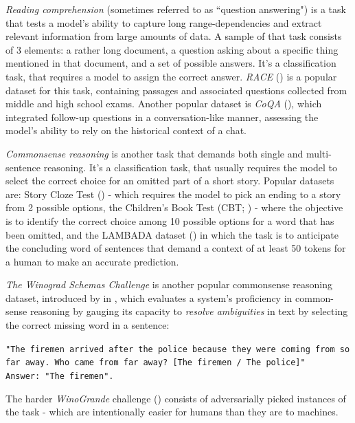 \documentclass{article}
\begin{document}
\medskip
\noindent
\emph{Reading comprehension} (sometimes referred to as ``question answering") is a task that tests a model's ability to capture long range-dependencies and extract relevant information from large amounts of data. A sample of that task consists of 3 elements: a rather long document, a question asking about a specific thing mentioned in that document, and a set of possible answers. It's a classification task, that requires a model to assign the correct answer. \emph{RACE} (\citet{lai2017race}) is a popular dataset for this task, containing passages and associated questions collected from middle and high school exams. Another popular dataset is \emph{CoQA} (\citet{reddy2019coqa}), which integrated follow-up questions in a conversation-like manner, assessing the model's ability to rely on the historical context of a chat.

\medskip
\noindent
\emph{Commonsense reasoning} is another task that demands both single and multi-sentence reasoning. It's a classification task, that usually requires the model to select the correct choice for an omitted part of a short story. Popular datasets are: Story Cloze Test (\citet{mostafazadeh2017cloze}) - which requires the model to pick an ending to a story from 2 possible options, the Children's Book Test (CBT; \citet{hill2015cbt}) - where the objective is to identify the correct choice among 10 possible options for a word that has been omitted, and the LAMBADA dataset (\citet{paperno2016lambada}) in which the task is to anticipate the concluding word of sentences that demand a context of at least 50 tokens for a human to make an accurate prediction.

\medskip
\noindent
\emph{The Winograd Schemas Challenge} is another popular commonsense reasoning dataset, introduced by \citet{levesque2012winogrand} in \citeyear{levesque2012winogrand}, which evaluates a system's proficiency in common-sense reasoning by gauging its capacity to \emph{resolve ambiguities} in text by selecting the correct missing word in a sentence:
\begin{center}
    \texttt{"The firemen arrived after the police because they were coming from so far away. Who came from far away? [The firemen / The police]"}\\
    \texttt{Answer: "The firemen".}
\end{center}
The harder \emph{WinoGrande} challenge (\citet{winogrande}) consists of adversarially picked instances of the task - which are intentionally easier for humans than they are to machines. 
\end{document}

